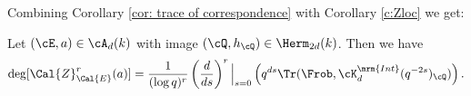 Combining Corollary \ref{cor: trace of correspondence} with Corollary \ref{c:Zloc} we get:
\begin{cor}
\notready\label{cor: KR degree as trace of Frob} Let $(\cE,a)\in \cA_{d}(k)$ with image $(\cQ,h_{\cQ})\in \Herm_{2d}(k)$. Then we have
\[
\deg [\Cal{Z}^{r}_{\Cal{E}}(a)] = \frac{1}{(\log q)^r} \left(\frac{d}{ds}\right)^r\Big|_{s=0} \left(q^{ds}\Tr(\Frob, \cK_d^{\mrm{Int}}(q^{-2s})_{\cQ})\right).
\]
\end{cor}


%
%
